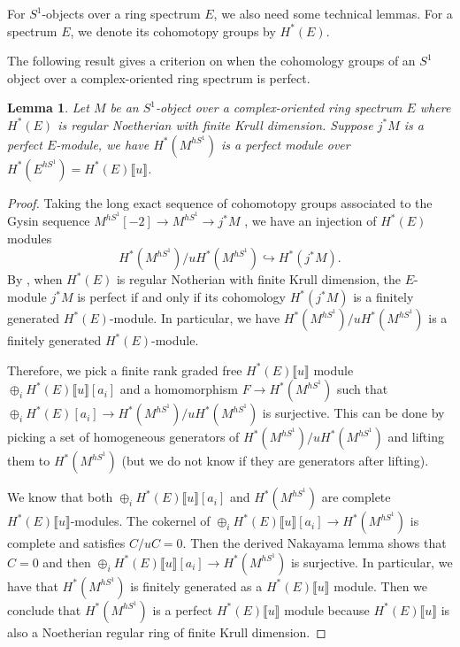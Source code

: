\documentclass[11pt]{amsart}
\numberwithin{equation}{section}
\theoremstyle{plain}
\newtheorem{Lemma}[lemma]{Lemma}
\theoremstyle{definition}
\theoremstyle{remark}
\newcommand{\fpw}[1]{{\llbracket #1\rrbracket}}
\begin{document}
For $S^1$-objects over a ring spectrum $E$, we also need some technical lemmas. For a spectrum $E$, we denote its cohomotopy groups by $H^*(E)$.






The following result gives a criterion on when the cohomology groups of an $S^1$ object over a complex-oriented ring spectrum is perfect.

\begin{Lemma}\label{lem:perfectness}Let $M$ be an $S^1$-object over a complex-oriented ring spectrum $E$ where $H^*(E)$ is regular Noetherian with finite Krull dimension. Suppose $j^*M$ is a perfect $E$-module, we have $H^*(M^{hS^1})$ is a perfect module over $H^*(E^{hS^1})=H^*(E)\fpw{u}$.
\end{Lemma}
\begin{proof}
Taking the long exact sequence of cohomotopy groups associated to the Gysin sequence $M^{hS^1}[-2]\to M^{hS^1}\to j^*M$ \cite[Proposition 2.22]{Li-Zhang26-1}, we have an injection of $H^*(E)$ modules
\[H^*(M^{hS^1})/uH^*(M^{hS^1}) \hookrightarrow H^*(j^*M).\]
By \cite[Proposition 2.13]{AntieauMathewNikolaus}, when $H^*(E)$ is regular Notherian with finite Krull dimension, the $E$-module $j^*M$ is perfect if and only if its cohomology $H^*(j^*M)$ is a finitely generated $H^*(E)$-module. In particular, we have $H^*(M^{hS^1})/uH^*(M^{hS^1}) $ is a finitely generated $H^*(E)$-module.

Therefore, we pick a finite rank graded free $H^*(E)\fpw{u}$ module $\oplus_i H^*(E)\fpw{u}[a_i]$ and a homomorphism $F\to H^*(M^{hS^1})$ such that $\oplus_i H^*(E)[a_i] \to H^*(M^{hS^1})/uH^*(M^{hS^1})$ is surjective. This can be done by picking a set of homogeneous generators of $ H^*(M^{hS^1})/uH^*(M^{hS^1})$ and lifting them to $ H^*(M^{hS^1})$ (but we do not know if they are generators after lifting).

We know that both $\oplus_i H^*(E)\fpw{u}[a_i]$ and $H^*(M^{hS^1})$ are complete $H^*(E)\fpw{u}$-modules. The cokernel of $\oplus_{i}H^*(E)\fpw{u}[a_i]\to H^*(M^{hS^1})$ is complete and satisfies $C/uC=0$. Then the derived Nakayama lemma \cite[Proposition 6.5]{DwyerGreenlees} shows that $C=0$ and then $\oplus_i H^*(E)\fpw{u}[a_i]\to H^*(M^{hS^1})$ is surjective. In particular, we have that $H^*(M^{hS^1})$ is finitely generated as a $H^*(E)\fpw{u}$ module. Then we conclude that $H^*(M^{hS^1})$ is a perfect $H^*(E)\fpw{u}$ module because $H^*(E)\fpw{u}$ is also a Noetherian regular ring of finite Krull dimension.\end{proof}
\end{document}
